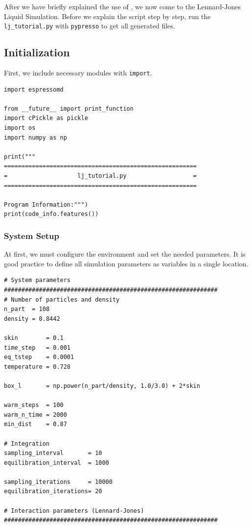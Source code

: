 \documentclass[
paper=a4,                       %
fontsize=11pt,                  %
twoside,                        %
footsepline,                    %
headsepline,                    %
headinclude=false,              %
footinclude=false,              %
pagesize,                       %
]{scrartcl}
\begin{document}
After we have briefly explained the use of \es{}, we now come to the
Lennard-Jones Liquid Simulation.  Before we explain the script step by step, run the
\texttt{lj\_tutorial.py}  with \texttt{pypresso} to get all generated files.


\subsection{Initialization}

First, we include necessary modules with \lstinline|import|.
{\small\vspace{0,2cm}
\begin{lstlisting}
import espressomd

from __future__ import print_function
import cPickle as pickle
import os 
import numpy as np

print("""
=======================================================
=                    lj_tutorial.py                   =
=======================================================

Program Information:""")
print(code_info.features())
\end{lstlisting}\vspace{0,2cm}

\subsubsection{System Setup}
At first, we must configure the environment and set the needed parameters.
It is good practice to define all simulation parameters as variables in a single location.
{\small\vspace{0,2cm}
\begin{lstlisting}
# System parameters
#############################################################
# Number of particles and density
n_part  = 108
density = 0.8442

skin        = 0.1
time_step   = 0.001 
eq_tstep    = 0.0001
temperature = 0.728

box_l       = np.power(n_part/density, 1.0/3.0) + 2*skin

warm_steps  = 100
warm_n_time = 2000
min_dist    = 0.87

# Integration
sampling_interval       = 10
equilibration_interval  = 1000

sampling_iterations     = 10000
equilibration_iterations= 20

# Interaction parameters (Lennard-Jones)
#############################################################


\end{lstlisting}}}
\end{document}
